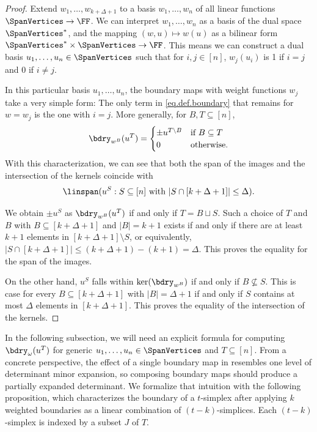 \documentclass{toc}
\begin{document}
\begin{proof}
    Extend $w_1,\dots,w_{k+\Delta+1}$ to a basis $w_1,\dots,w_n$ of all linear functions $\SpanVertices\to \FF$. We can interpret $w_1,\dots,w_n$ as a basis of the dual space $\SpanVertices^*$, and the mapping $(w,u) \mapsto w(u)$ as a bilinear form $\SpanVertices^*\times \SpanVertices\to\FF$. This means we can construct a dual basis $u_1,\dots,u_n\in \SpanVertices$ such that for $i,j\in [n]$, $w_j(u_i)$ is 1 if $i=j$ and 0 if $i\neq j$.

    In this particular basis $u_1,\dots,u_n$, the boundary maps with weight functions $w_j$ take a very simple form: The only term in \eqref{eq.def.boundary} that remains for $w=w_j$ is the one with $i=j$. More generally,  
    for $B, T \subseteq [n]$,
    \begin{equation}\label{eq.bdry.special} 
    \bdry_{w^B} (u^T) =
    \begin{cases}
        \pm u^{T \setminus B} & \text{if $B\subseteq T$}\\
        0 & \text{otherwise.}
    \end{cases}
    \end{equation}
    With this characterization, we can see that both the span of the images and the intersection of the kernels 
    coincide with
    \[\linspan(u^S: S \subseteq [n] \text{ with } |S \cap [k+\Delta+1]| \le \Delta). \]
    
    We obtain $\pm u^S$ as $\bdry_{w^B} (u^T)$ if and only if $T = B \sqcup S$. Such a choice of $T$ and $B$ with $B \subseteq [k+\Delta+1]$ and $|B|=k+1$ exists if and only if there are at least $k+1$ elements in $[k+\Delta+1] \setminus S$, or equivalently, $|S \cap [k+\Delta+1]| \le (k+\Delta+1)-(k+1) = \Delta$. This proves the equality for the span of the images.
    
    On the other hand, $u^S$ falls within $\ker(\bdry_{w^B})$ if and only if $B \not\subseteq S$. This is case for every $B \subseteq [k+\Delta+1]$ with $|B|=\Delta+1$ if and only if $S$ contains at most $\Delta$ elements in $[k+\Delta+1]$. This proves the equality of the intersection of the kernels.
\end{proof}

In the following subsection, we will need an explicit formula for computing $\bdry_{\omega}(u^T)$ for generic $u_1, \dots, u_n \in \SpanVertices$ and $T \subseteq [n]$. From a concrete perspective, the effect of a single boundary map in  resembles one level of determinant minor expansion, so composing boundary maps should produce a partially expanded determinant. We formalize that intuition with the following proposition, which characterizes the boundary of a $t$-simplex after applying $k$ weighted boundaries as a linear combination of $(t-k)$-simplices. Each $(t-k)$-simplex is indexed by a subset $J$ of $T$.
\end{document}
